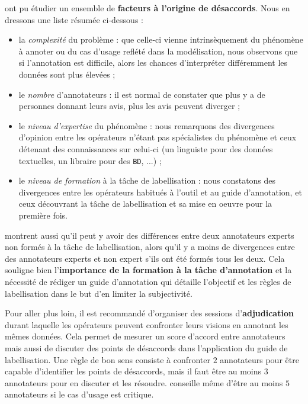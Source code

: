 			\cite{bayerl-paul:2011:what-determines-intercoder} ont pu étudier un ensemble de \textbf{facteurs à l'origine de désaccords}.
			Nous en dressons une liste résumée ci-dessous :
			\begin{itemize}
				\item la \textit{complexité} du problème :
				que celle-ci vienne intrinsèquement du phénomène à annoter ou du cas d'usage reflété dans la modélisation, nous observons que si l'annotation est difficile, alors les chances d'interpréter différemment les données sont plus élevées ;
				\item le \textit{nombre} d'annotateurs :
				il est normal de constater que plus y a de personnes donnant leurs avis, plus les avis peuvent diverger ;
				\item le \textit{niveau d'expertise} du phénomène :
				nous remarquons des divergences d'opinion entre les opérateurs n'étant pas spécialistes du phénomène et ceux détenant des connaissances sur celui-ci (un linguiste pour des données textuelles, un libraire pour des \texttt{BD}, ...) ;
				\item le \textit{niveau de formation} à la tâche de labellisation :
				nous constatons des divergences entre les opérateurs habitués à l'outil et au guide d'annotation, et ceux découvrant la tâche de labellisation et sa mise en oeuvre pour la première fois.
			\end{itemize}
			\begin{leftBarInformation}
				\cite{bayerl-paul:2011:what-determines-intercoder} montrent aussi qu'il peut y avoir des différences entre deux annotateurs experts non formés à la tâche de labellisation, alors qu'il y a moins de divergences entre des annotateurs experts et non expert s'ils ont été formés tous les deux.
				Cela souligne bien l'\textbf{importance de la formation à la tâche d'annotation} et la nécessité de rédiger un guide d'annotation qui détaille l'objectif et les règles de labellisation dans le but d'en limiter la subjectivité.
			\end{leftBarInformation}
			\begin{leftBarIdea}
				Pour aller plus loin, il est recommandé d'organiser des sessions d'\textbf{adjudication} durant laquelle les opérateurs peuvent confronter leurs visions en annotant les mêmes données.
				Cela permet de mesurer un score d'accord entre annotateurs mais aussi de discuter des points de désaccords dans l'application du guide de labellisation.
				Une règle de bon sens consiste à confronter $2$ annotateurs pour être capable d'identifier les points de désaccords, mais il faut être au moins $3$ annotateurs pour en discuter et les résoudre.
				\cite{bayerl-paul:2011:what-determines-intercoder} conseille même d'être au moins $5$ annotateurs si le cas d'usage est critique.
			\end{leftBarIdea}
		
